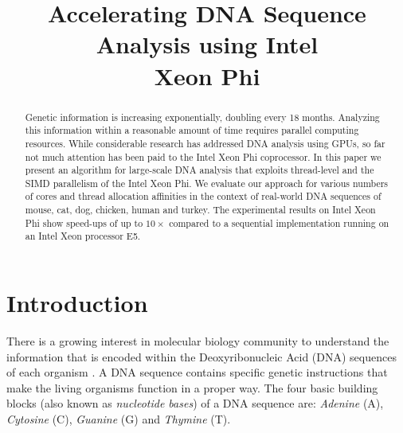 \documentclass[conference]{IEEEtran}
\begin{document}
\title{Accelerating DNA Sequence Analysis using Intel\textsuperscript{\textregistered} \\Xeon Phi\texttrademark}

\author{
}


\maketitle


\begin{abstract}
Genetic information is increasing exponentially, doubling every 18 months. Analyzing this information within a reasonable amount of time requires parallel computing resources. While considerable research has addressed DNA analysis using GPUs, so far not much attention has been paid to the Intel Xeon Phi coprocessor. In this paper we present an algorithm for large-scale DNA analysis that exploits thread-level and the SIMD parallelism of the Intel Xeon Phi. We evaluate our approach for various numbers of cores and thread allocation affinities in the context of real-world DNA sequences of mouse, cat, dog, chicken, human and turkey. The experimental results on Intel Xeon Phi show speed-ups of up to $10\times$ compared to a sequential implementation running on an Intel Xeon processor E5.
\end{abstract}


\IEEEpeerreviewmaketitle


\section{Introduction} \label{introduction}


There is a growing interest in molecular biology community to understand the information that is encoded within the Deoxyribonucleic Acid (DNA) sequences of each organism \cite{Editorial}. A DNA sequence contains specific genetic instructions that make the living organisms function in a proper way. The four basic building blocks (also known as \emph{nucleotide bases}) of a DNA sequence are: \emph{Adenine} (A), \emph{Cytosine} (C), \emph{Guanine} (G) and \emph{Thymine} (T). 
\end{document}
